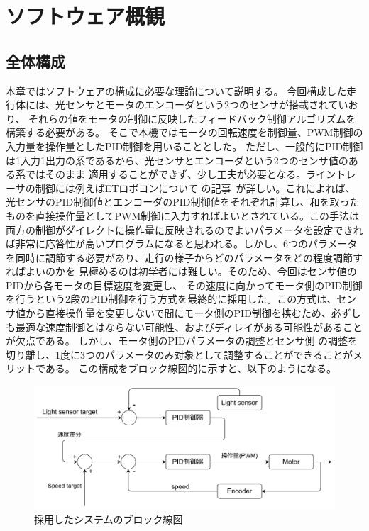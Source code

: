 \documentclass{ltjsreport}
\begin{document}
\section{ソフトウェア概観}
\subsection{全体構成}
本章ではソフトウェアの構成に必要な理論について説明する。
今回構成した走行体には、光センサとモータのエンコーダという2つのセンサが搭載されていおり、
それらの値をモータの制御に反映したフィードバック制御アルゴリズムを構築する必要がある。
そこで本機ではモータの回転速度を制御量、PWM制御の入力量を操作量としたPID制御を用いることとした。
ただし、一般的にPID制御は1入力1出力の系であるから、光センサとエンコーダという2つのセンサ値のある系ではそのまま
適用することができず、少し工夫が必要となる。ライントレーサの制御には例えばETロボコンについて
の記事~\cite{ETM}が詳しい。これによれば、光センサのPID制御値とエンコーダのPID制御値をそれぞれ計算し、和を取ったものを直接操作量としてPWM制御に入力すればよいとされている。この手法は両方の制御がダイレクトに操作量に反映されるのでよいパラメータを設定できれば非常に応答性が高いプログラムになると思われる。しかし、6つのパラメータを同時に調節する必要があり、走行の様子からどのパラメータをどの程度調節すればよいのかを
見極めるのは初学者には難しい。そのため、今回はセンサ値のPIDから各モータの目標速度を変更し、
その速度に向かってモータ側のPID制御を行うという2段のPID制御を行う方式を最終的に採用した。この方式は、センサ値から直接操作量を変更しないで間にモータ側のPID制御を挟むため、必ずしも最適な速度制御とはならない可能性、およびディレイがある可能性があることが欠点である。
しかし、モータ側のPIDパラメータの調整とセンサ側
の調整を切り離し、1度に3つのパラメータのみ対象として調整することができることがメリットである。
この構成をブロック線図的に示すと、以下のようになる。

\begin{figure}[tbh]
  \centering
  \includegraphics[keepaspectratio, scale=0.05]
       {img/block_line.drawio.png}
  \caption{採用したシステムのブロック線図}
  \label{fig:blockline}
 \end{figure}
\end{document}

